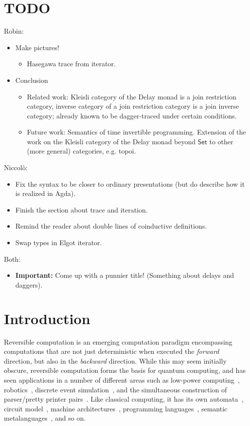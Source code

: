 \documentclass[runningheads,a4paper]{llncs}
\newcommand{\Set}{\mathsf{Set}}
\begin{document}
\section{TODO} %
\label{sec:todo}
Robin:
\begin{itemize}
  \item Make pictures! 
  \begin{itemize}
    \item Hasegawa trace from iterator.
  \end{itemize}
  \item Conclusion
  \begin{itemize}
    \item Related work: Kleisli category of the Delay monad is a join
    restriction category, inverse category of a join restriction category is a
    join inverse category; already known to be dagger-traced under certain
    conditions.
    \item Future work: Semantics of time invertible programming. Extension of
    the work on the Kleisli category of the Delay monad beyond $\Set$ to other
    (more general) categories, e.g. topoi.
  \end{itemize}
\end{itemize}
Niccolò: 
\begin{itemize}
  \item Fix the syntax to be closer to ordinary presentations (but do describe 
  how it is realized in Agda).
  \item Finish the section about trace and iteration.
  \item Remind the reader about double lines of coinductive definitions.
  \item Swap types in Elgot iterator.
\end{itemize}
Both:
\begin{itemize}
  \item \textbf{Important:} Come up with a punnier title! (Something about 
  delays and daggers).
\end{itemize}

\section{Introduction}\label{sec:intro}
Reversible computation is an emerging computation paradigm encompassing
computations that are not just deterministic when executed the \emph{forward}
direction, but also in the \emph{backward} direction. While this may seem
initially obscure, reversible computation forms the basis for quantum
computing, and has seen applications in a number of different areas such as
low-power computing~\cite{Landauer61}, robotics~\cite{SchultzLE18}, discrete
event simulation~\cite{Schordan15}, and the simultaneous construction of
parser/pretty printer pairs~\cite{RendelO10}. Like classical computing, it has
its own automata~\cite{Bennett73}, circuit model~\cite{DeVos10}, machine
architectures~\cite{ThomsenAG11}, programming
languages~\cite{JamesS12,JamesS14,YokoyamaG07,Schultz18,JacobsenKT18}, semantic
metalanguages~\cite{Giles,KaarsgaardAG17,KaarsgaardG18}, and so on.
\end{document}
